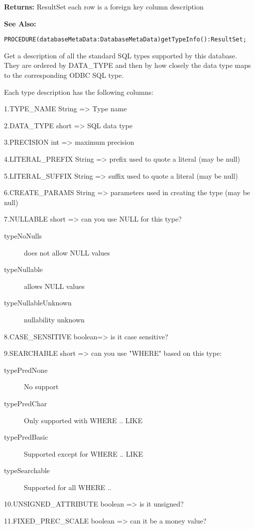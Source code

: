 {\bf Returns: } 
ResultSet each row is a foreign key column description 

{\bf See Also:} 




\verb'PROCEDURE(databaseMetaData:DatabaseMetaData)getTypeInfo():ResultSet;'






Get a description of all the standard SQL types supported by this database. They are ordered by DATA\_TYPE and then by how closely the data type maps to the corresponding ODBC SQL type. 

Each type description has the following columns: 

1.TYPE\_NAME String => Type name 

2.DATA\_TYPE short => SQL data type 

3.PRECISION int => maximum precision 

4.LITERAL\_PREFIX String => prefix used to quote a literal (may be null) 

5.LITERAL\_SUFFIX String => suffix used to quote a literal (may be null) 

6.CREATE\_PARAMS String => parameters used in creating the type (may be null) 

7.NULLABLE short => can you use NULL for this type? 
\begin{description}
\item[typeNoNulls] does not allow NULL values 
\item[typeNullable] allows NULL values 
\item[typeNullableUnknown] nullability unknown 
\end{description}

8.CASE\_SENSITIVE boolean=> is it case sensitive? 

9.SEARCHABLE short => can you use "WHERE" based on this type: 
\begin{description}
\item[typePredNone] No support 
\item[typePredChar] Only supported with WHERE .. LIKE 
\item[typePredBasic] Supported except for WHERE .. LIKE 
\item[typeSearchable] Supported for all WHERE .. 
\end{description}

10.UNSIGNED\_ATTRIBUTE boolean => is it unsigned? 

11.FIXED\_PREC\_SCALE boolean => can it be a money value? 

